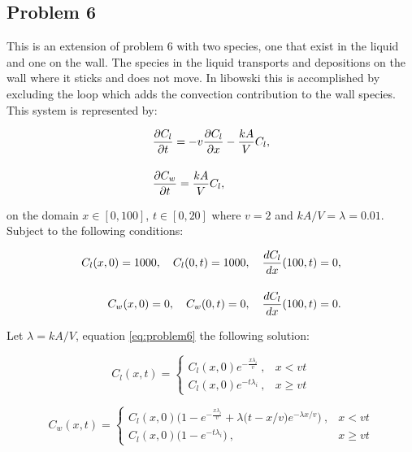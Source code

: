 \clearpage

\subsection{Problem 6}
This is an extension of problem 6 with two species, one that exist in the liquid and one on the wall. The species in the liquid transports and depositions on the wall where it sticks and does not move. In libowski this is accomplished by excluding the loop which adds the convection contribution to the wall species. This system is represented by:

\begin{equation}
\setlength{\jot}{15pt}
\begin{split}
    &\frac{\partial C_{l}}{\partial t} = -v\frac{\partial C_{l}}{\partial x} - \frac{kA}{V} C_{l}, \\
    &\frac{\partial C_{w}}{\partial t} = \frac{kA}{V} C_{l},
    \label{eq:problem6}
\end{split}
\end{equation}

\noindent on the domain $x \in [0,100]$, $t \in [0, 20]$ where $v = 2$ and $kA/V = \lambda = 0.01$. Subject to the following conditions:

\begin{equation}
\setlength{\jot}{15pt}
\begin{split}
    C_{l}(x, 0) = 1000, \quad C_{l}(0,t) = 1000, \quad \frac{dC_{l}}{dx}(100, t) = 0, \\
    C_{w}(x, 0) = 0, \quad C_{w}(0,t) = 0, \quad \frac{dC_{l}}{dx}(100, t) = 0. \\
\end{split}
\end{equation}

\noindent Let $\lambda = kA/V$, equation \ref{eq:problem6} the following solution:

\begin{equation}
C_{l} (x,t) = \begin{cases}
  C_{l} (x, 0) e^{-\frac{x \lambda _i}{v}}\ , & x < vt \\
  C_{l} (x, 0) e^{-t \lambda _i}\ , & x \ge vt
\end{cases}
\end{equation}

\begin{equation}
C_{w} (x,t) = \begin{cases}
  C_{l} (x, 0) \Big( 1 - e^{-\frac{x \lambda _i}{v}} + \lambda \big(t - x/v\big)e^{-\lambda x/v} \Big)\ , & x < vt \\
  C_{l} (x, 0) \Big( 1 - e^{-t \lambda _i}\Big)\ , & x \ge vt
\end{cases}
\end{equation}

